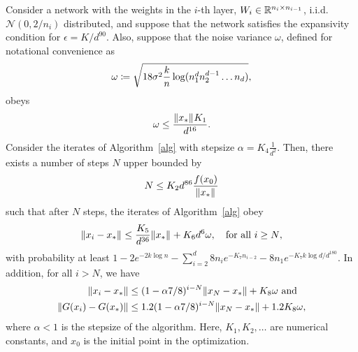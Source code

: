 \begin{theorem}
\label{thm:main-rescaled}
Consider a network with the weights in the $i$-th layer, $W_i \in \mathbb{R}^{n_i \times n_{i-1}}$, i.i.d.~$\mathcal N(0,2/n_i)$ distributed, and suppose that the network satisfies the expansivity condition for $\epsilon = K/d^{90}$. %
Also, suppose that the noise variance $\omega$, defined for notational convenience as 
\[
\omega
\coloneqq
\sqrt{ 18\sigma^2 \frac{k}{n}
\log(n_1^d n_2^{d-1}\ldots n_d)},
\]
obeys
\[
\omega \leq \frac{{\left\|x_\ast\right\|}_{} K_1}{d^{16}}.
\]
Consider the iterates of Algorithm~\ref{alg} with stepsize
$\alpha = K_4\frac{1}{d^2}$.
Then, there exists a number of steps $N$ upper bounded by
\[
N
\leq
K_2 d^{86}
\frac{f(x_0)}{ {\left\|x_\ast\right\|}_{}}
\]
such that after $N$ steps, the iterates of Algorithm~\ref{alg} obey
\begin{align}
\label{eq:errorxixo-rescaled}
{\left\|x_i -x_\ast\right\|}_{}
\leq
\frac{K_5}{d^{36}}  {\left\|x_\ast\right\|}_{} 
+
K_6 d^6 \omega,
\quad
\text{for all $i \geq N$},
\end{align}
with probability at least
$1-2e^{-2k \log n} - \sum_{i=2}^d 8 n_i e^{-K_7 n_{i-2} }
- 8 n_1 e^{-K_7  k  \log d / d^{180}}
$.
In addition, for all $i > N$, we have
\begin{align}
\|x_{i} - x_*\| &\leq (1 -  \alpha 7/8 )^{i - N} \|x_N - x_*\| + K_8 \omega \hbox{ and }  \label{GA:e68} \\
\|G(x_{i}) - G(x_*)\| &\leq 1.2 (1 -  \alpha 7/8 )^{i - N} \|x_N - x_*\| + 1.2 K_8 \omega, \label{GA:e74}
\end{align}
where $\alpha < 1$ is the stepsize of the algorithm.
Here, $K_1,K_2, \ldots$ are numerical constants, and $x_0$ is the initial point in the optimization.
\end{theorem}


